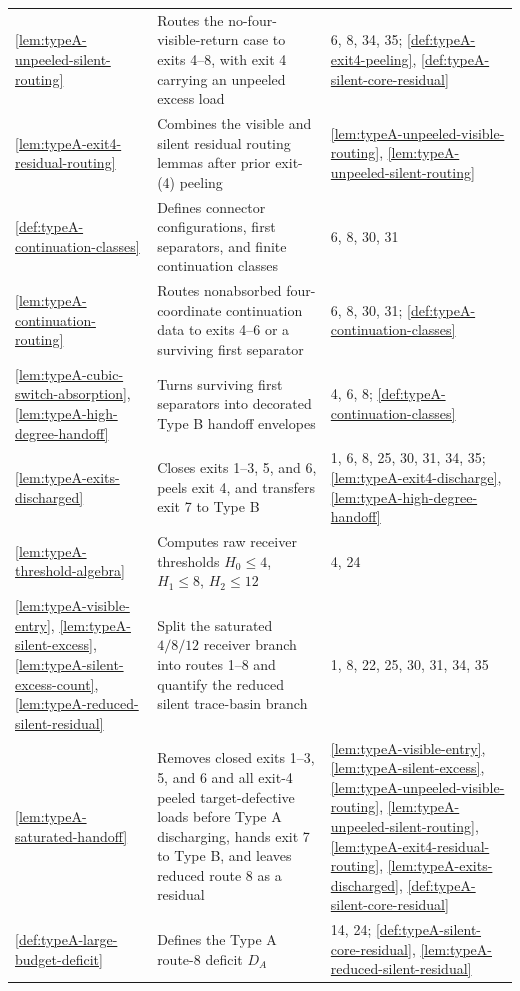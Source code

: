 \documentclass[11pt]{article}
\begin{document}
{\begin{longtable}{L{0.31\textwidth} L{0.42\textwidth} L{0.17\textwidth}}
\cref{lem:typeA-unpeeled-silent-routing} & Routes the no-four-visible-return case to exits 4--8, with exit 4 carrying an unpeeled excess load & 6, 8, 34, 35; \cref{def:typeA-exit4-peeling}, \cref{def:typeA-silent-core-residual} \\
\cref{lem:typeA-exit4-residual-routing} & Combines the visible and silent residual routing lemmas after prior exit-(4) peeling & \cref{lem:typeA-unpeeled-visible-routing}, \cref{lem:typeA-unpeeled-silent-routing} \\
\cref{def:typeA-continuation-classes} & Defines connector configurations, first separators, and finite continuation classes & 6, 8, 30, 31 \\
\cref{lem:typeA-continuation-routing} & Routes nonabsorbed four-coordinate continuation data to exits 4--6 or a surviving first separator & 6, 8, 30, 31; \cref{def:typeA-continuation-classes} \\
\cref{lem:typeA-cubic-switch-absorption}, \cref{lem:typeA-high-degree-handoff} & Turns surviving first separators into decorated Type B handoff envelopes & 4, 6, 8; \cref{def:typeA-continuation-classes} \\
\cref{lem:typeA-exits-discharged} & Closes exits 1--3, 5, and 6, peels exit 4, and transfers exit 7 to Type B & 1, 6, 8, 25, 30, 31, 34, 35; \cref{lem:typeA-exit4-discharge}, \cref{lem:typeA-high-degree-handoff} \\
\cref{lem:typeA-threshold-algebra} & Computes raw receiver thresholds $H_0\le4$, $H_1\le8$, $H_2\le12$ & 4, 24 \\
\cref{lem:typeA-visible-entry}, \cref{lem:typeA-silent-excess}, \cref{lem:typeA-silent-excess-count}, \cref{lem:typeA-reduced-silent-residual} & Split the saturated $4/8/12$ receiver branch into routes 1--8 and quantify the reduced silent trace-basin branch & 1, 8, 22, 25, 30, 31, 34, 35 \\
\cref{lem:typeA-saturated-handoff} & Removes closed exits 1--3, 5, and 6 and all exit-4 peeled target-defective loads before Type A discharging, hands exit 7 to Type B, and leaves reduced route 8 as a residual & \cref{lem:typeA-visible-entry}, \cref{lem:typeA-silent-excess}, \cref{lem:typeA-unpeeled-visible-routing}, \cref{lem:typeA-unpeeled-silent-routing}, \cref{lem:typeA-exit4-residual-routing}, \cref{lem:typeA-exits-discharged}, \cref{def:typeA-silent-core-residual} \\
\cref{def:typeA-large-budget-deficit} & Defines the Type A route-8 deficit \(D_A\) & 14, 24; \cref{def:typeA-silent-core-residual}, \cref{lem:typeA-reduced-silent-residual} \\

\end{longtable}}
\end{document}
